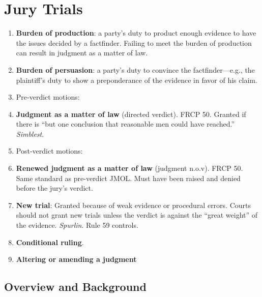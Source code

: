 \section{Jury Trials}

\begin{enumerate}
    \item \textbf{Burden of production}: a party's duty to product enough 
    evidence to have the issues decided by a factfinder. Failing to meet the 
    burden of production can result in judgment as a matter of law.
    \item \textbf{Burden of persuasion}: a party's duty to convince the 
    factfinder---e.g., the plaintiff's duty to show a preponderance of the 
    evidence in favor of his claim.
    \item Pre-verdict motions:
        \item \textbf{Judgment as a matter of law} (directed verdict). FRCP 
        50. Granted if there is ``but one conclusion that reasonable men could 
        have reached.'' \emph{Simblest}.
    \item Post-verdict motions:
        \item \textbf{Renewed judgment as a matter of law} (judgment n.o.v). 
        FRCP 50. Same standard as pre-verdict JMOL. Must have been raised and 
        denied before the jury's verdict.
        \item \textbf{New trial}: Granted because of weak evidence or 
        procedural errors. Courts should not grant new trials unless the 
        verdict is against the ``great weight'' of the evidence.  
        \emph{Spurlin}. Rule 59 controls.
        \item \textbf{Conditional ruling}.
        \item \textbf{Altering or amending a judgment}
\end{enumerate}

\subsection{Overview and Background}

